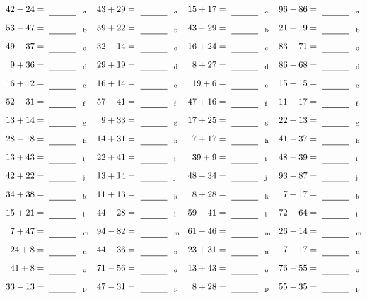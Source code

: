 \documentclass
[
  draft    = true,
  fontsize = 11pt,
  parskip  = half-
]
{scrartcl}
\begin{document}
\clearpage
\begin{align*}
    \pline{42-24}&=\rline{a}
  & \pline{43+29}&=\rline{a}
  & \pline{15+17}&=\rline{a}
  & \pline{96-86}&=\rline{a} \\[1ex]
    \pline{53-47}&=\rline{b}
  & \pline{59+22}&=\rline{b}
  & \pline{43-29}&=\rline{b}
  & \pline{21+19}&=\rline{b} \\[1ex]
    \pline{49-37}&=\rline{c}
  & \pline{32-14}&=\rline{c}
  & \pline{16+24}&=\rline{c}
  & \pline{83-71}&=\rline{c} \\[1ex]
    \pline{9+36}&=\rline{d}
  & \pline{29+19}&=\rline{d}
  & \pline{8+27}&=\rline{d}
  & \pline{86-68}&=\rline{d} \\[1ex]
    \pline{16+12}&=\rline{e}
  & \pline{16+14}&=\rline{e}
  & \pline{19+6}&=\rline{e}
  & \pline{15+15}&=\rline{e} \\[1ex]
    \pline{52-31}&=\rline{f}
  & \pline{57-41}&=\rline{f}
  & \pline{47+16}&=\rline{f}
  & \pline{11+17}&=\rline{f} \\[1ex]
    \pline{13+14}&=\rline{g}
  & \pline{9+33}&=\rline{g}
  & \pline{17+25}&=\rline{g}
  & \pline{22+13}&=\rline{g} \\[1ex]
    \pline{28-18}&=\rline{h}
  & \pline{14+31}&=\rline{h}
  & \pline{7+17}&=\rline{h}
  & \pline{41-37}&=\rline{h} \\[1ex]
    \pline{13+43}&=\rline{i}
  & \pline{22+41}&=\rline{i}
  & \pline{39+9}&=\rline{i}
  & \pline{48-39}&=\rline{i} \\[1ex]
    \pline{42+22}&=\rline{j}
  & \pline{13+14}&=\rline{j}
  & \pline{48-34}&=\rline{j}
  & \pline{93-87}&=\rline{j} \\[1ex]
    \pline{34+38}&=\rline{k}
  & \pline{11+13}&=\rline{k}
  & \pline{8+28}&=\rline{k}
  & \pline{7+17}&=\rline{k} \\[1ex]
    \pline{15+21}&=\rline{l}
  & \pline{44-28}&=\rline{l}
  & \pline{59-41}&=\rline{l}
  & \pline{72-64}&=\rline{l} \\[1ex]
    \pline{7+47}&=\rline{m}
  & \pline{94-82}&=\rline{m}
  & \pline{61-46}&=\rline{m}
  & \pline{26-14}&=\rline{m} \\[1ex]
    \pline{24+8}&=\rline{n}
  & \pline{44-36}&=\rline{n}
  & \pline{23+31}&=\rline{n}
  & \pline{7+17}&=\rline{n} \\[1ex]
    \pline{41+8}&=\rline{o}
  & \pline{71-56}&=\rline{o}
  & \pline{13+43}&=\rline{o}
  & \pline{76-55}&=\rline{o} \\[1ex]
    \pline{33-13}&=\rline{p}
  & \pline{47-31}&=\rline{p}
  & \pline{8+28}&=\rline{p}
  & \pline{55-35}&=\rline{p}
\end{align*}
\end{document}
